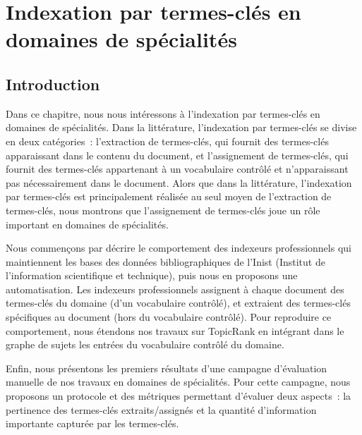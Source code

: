 \chapter{Indexation par termes-clés en domaines de spécialités}
\label{chap:main-domain_specific_keyphrase_annotation}


  \section{Introduction}
  \label{sec:main:domain_specific_keyphrase_annotation-introduction}
    Dans ce chapitre, nous nous intéressons à l'indexation par
    termes-clés en domaines de spécialités. Dans la littérature, l'indexation
    par termes-clés se divise en deux catégories~: l'extraction de termes-clés,
    qui fournit des termes-clés apparaissant dans le contenu du document, et
    l'assignement de termes-clés, qui fournit des termes-clés appartenant à un
    vocabulaire contrôlé et n'apparaissant pas nécessairement dans le document.
    Alors que dans la littérature, l'indexation par termes-clés est
    principalement réalisée au seul moyen de l'extraction de termes-clés, nous
    montrons que l'assignement de termes-clés joue un rôle important en domaines
    de spécialités.

    Nous commençons par décrire le comportement des indexeurs
    professionnels qui maintiennent les bases des données bibliographiques de
    l'Inist (Institut de l'information scientifique et technique), puis nous en
    proposons une automatisation. Les indexeurs professionnels assignent à
    chaque document des termes-clés du domaine (d'un vocabulaire contrôlé), et
    extraient des termes-clés spécifiques au document (hors du vocabulaire
    contrôlé). Pour reproduire ce comportement, nous étendons nos travaux sur
    TopicRank en intégrant dans le graphe de sujets les entrées du vocabulaire
    contrôlé du domaine.

    Enfin, nous présentons les premiers résultats d'une campagne d'évaluation
    manuelle de nos travaux en domaines de spécialités. Pour cette campagne,
    nous proposons un protocole et des métriques permettant d'évaluer deux
    aspects~: la pertinence des termes-clés extraits/assignés et la quantité
    d'information importante capturée par les termes-clés.

